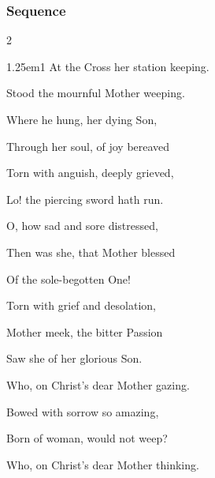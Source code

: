 

\clearpage
\subsubsection{Sequence}\label{dolorosa}

\vspace{-0.75\baselineskip}

\begin{multicols}{2}
\begin{hangparas}{1.25em}{1}
At the Cross her station keeping.

Stood the mournful Mother weeping.

Where he hung, her dying Son,

\vspace{0.5\baselineskip}

Through her soul, of joy bereaved

Torn with anguish, deeply grieved,

Lo! the piercing sword hath run.

\vspace{0.5\baselineskip}

O, how sad and sore distressed,

Then was she, that Mother blessed

Of the sole-begotten One!

\vspace{0.5\baselineskip}

Torn with grief and desolation,

Mother meek, the bitter Passion

Saw she of her glorious Son.

\vspace{0.5\baselineskip}

Who, on Christ's dear Mother gazing.

Bowed with sorrow so amazing,

Born of woman, would not weep?

\vspace{0.5\baselineskip}

Who, on Christ's dear Mother thinking.


\end{hangparas}
\end{multicols}
